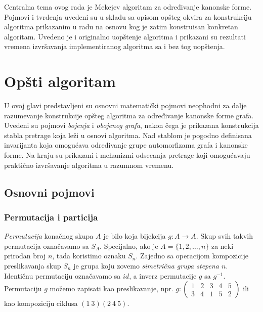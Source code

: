 \documentclass[12pt,oneside]{memoir}
\theoremstyle{definition}
\begin{document}
 Centralna tema ovog rada je Mekejev algoritam za određivanje kanonske forme.
 Pojmovi i tvrđenja uvedeni su u skladu sa opisom opšteg okvira za konstrukciju
 algoritma prikazanim u radu \cite{McKay} na osnovu kog je zatim konstruisan
 konkretan algoritam. Uvedeno je i originalno uopštenje algoritma i prikazani
 su rezultati vremena izvršavanja implementiranog algoritma sa i bez tog
 uopštenja.

\chapter{Opšti algoritam}

 U ovoj glavi predstavljeni su osnovni matematički pojmovi neophodni za dalje
 razumevanje konstrukcije opšteg algoritma za određivanje kanonske forme grafa.
 Uvedeni su pojmovi \emph{bojenja} i \emph{obojenog grafa}, nakon čega je
 prikazana konstrukcija stabla pretrage koja leži u osnovi algoritma. Nad
 stablom je pogodno definisana invarijanta koja omogućava određivanje grupe
 automorfizama grafa i kanonske forme. Na kraju su prikazani i mehanizmi
 odsecanja pretrage koji omogućavaju praktično izvršavanje algoritma u razumnom
 vremenu.

 \section{Osnovni pojmovi}

  \subsection{Permutacija i particija}

   \emph{Permutacija} konačnog skupa $A$ je bilo koja bijekcija $g : A \to A$.
   Skup svih takvih permutacija označavamo sa $S_A$. Specijalno, ako je $A =
   \{1, 2, \dots, n\}$ za neki prirodan broj $n$, tada koristimo oznaku $S_n$.
   Zajedno sa operacijom kompozicije preslikavanja skup $S_n$ je grupa koju
   zovemo \emph{simetrična grupa stepena $n$}. Identičnu permutaciju označavamo
   sa $id$, a inverz permutacije $g$ sa $g^{-1}$. Permutaciju $g$ možemo
   zapisati kao preslikavanje, npr.  $g : \begin{pmatrix} 1 & 2 & 3 & 4 & 5\\ 3
   & 4 & 1 & 5 & 2 \end{pmatrix}$ ili kao kompoziciju ciklusa $(1\ 3)(2\ 4\ 5)$.
\end{document}
